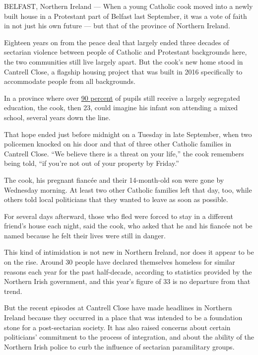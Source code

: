 BELFAST, Northern Ireland --- When a young Catholic cook moved into a
newly built house in a Protestant part of Belfast last September, it was
a vote of faith in not just his own future --- but that of the province
of Northern Ireland.

Eighteen years on from the peace deal that largely ended three decades
of sectarian violence between people of Catholic and Protestant
backgrounds here, the two communities still live largely apart. But the
cook's new home stood in Cantrell Close, a flagship housing project that
was built in 2016 specifically to accommodate people from all
backgrounds.

In a province where over
\href{http://cain.ulst.ac.uk/issues/education/docs/mag_2013-04-22.pdf}{90
percent} of pupils still receive a largely segregated education, the
cook, then 23, could imagine his infant son attending a mixed school,
several years down the line.

That hope ended just before midnight on a Tuesday in late September,
when two policemen knocked on his door and that of three other Catholic
families in Cantrell Close. ``We believe there is a threat on your
life,'' the cook remembers being told, ``if you're not out of your
property by Friday.''

The cook, his pregnant fiancée and their 14-month-old son were gone by
Wednesday morning. At least two other Catholic families left that day,
too, while others told local politicians that they wanted to leave as
soon as possible.

For several days afterward, those who fled were forced to stay in a
different friend's house each night, said the cook, who asked that he
and his fiancée not be named because he felt their lives were still in
danger.

This kind of intimidation is not new in Northern Ireland, nor does it
appear to be on the rise. Around 30 people have declared themselves
homeless for similar reasons each year for the past half-decade,
according to statistics provided by the Northern Irish government, and
this year's figure of 33 is no departure from that trend.

But the recent episodes at Cantrell Close have made headlines in
Northern Ireland because they occurred in a place that was intended to
be a foundation stone for a post-sectarian society. It has also raised
concerns about certain politicians' commitment to the process of
integration, and about the ability of the Northern Irish police to curb
the influence of sectarian paramilitary groups.

